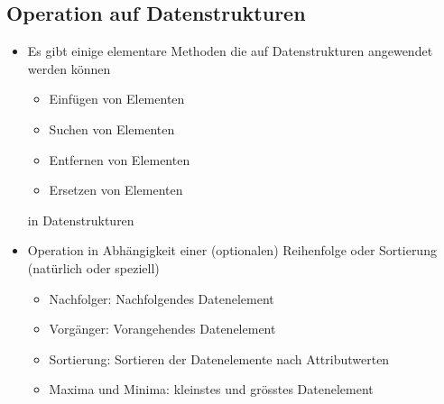 \documentclass[10pt,a4paper]{article}
\begin{document}
\subsection{Operation auf Datenstrukturen}
\begin{itemize}[noitemsep,topsep=0pt,leftmargin=*]
    \item Es gibt einige elementare Methoden die auf Datenstrukturen angewendet werden können
    \begin{itemize}[noitemsep,topsep=0pt,leftmargin=*]
        \item Einfügen von Elementen
        \item Suchen von Elementen
        \item Entfernen von Elementen
        \item Ersetzen von Elementen
    \end{itemize}
in Datenstrukturen
    \item Operation in Abhängigkeit einer (optionalen) Reihenfolge oder Sortierung (natürlich oder speziell)
    \begin{itemize}[noitemsep,topsep=0pt,leftmargin=*]
        \item Nachfolger: Nachfolgendes Datenelement
        \item Vorgänger: Vorangehendes Datenelement
        \item Sortierung: Sortieren der Datenelemente nach Attributwerten
        \item Maxima und Minima: kleinstes und grösstes Datenelement
    \end{itemize}
\end{itemize}
\end{document}

